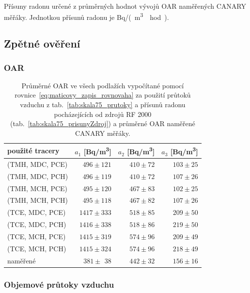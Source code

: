 \begin{table}[H]
    \centering
    \caption{Přísuny radonu určené z průměrných hodnot vývojů OAR naměřených CANARY měřáky. Jednotkou přísunů radonu je \si{Bq/(m^3\cdot hod)}.}
    \label{tab:skala75_prisunyRovnovazneCANARY}
   
\end{table}

\subsection{Zpětné ověření}

\subsubsection{OAR}
\begin{table}[H]
    \centering
    \caption{Průměrné OAR ve všech podlažích vypočítané pomocí rovnice~\eqref{eq:maticovy_zapis_rovnovaha} za použití průtoků vzduchu z tab.~\ref{tab:skala75_prutoky} a přísunů radonu pocházejících od zdrojů RF 2000 (tab.~\ref{tab:skala75_prisunyZdroj}) a průměrné OAR naměřené CANARY měřáky.}
    \label{tab:skala75_OAR_zpetne}
    \begin{tabular}{lrrr}
        \toprule
  použité tracery  & $a_1$ [\si{Bq/m^3}] &  $a_2$ [\si{Bq/m^3}]& $a_3$ [\si{Bq/m^3}] \\
        \midrule
(TMH, MDC, PCE) & $ 496\pm121$ & $410\pm72$ & $103\pm25$ \\
(TMH, MDC, PCH) & $ 496\pm119$ & $410\pm72$ & $107\pm26$ \\
(TMH, MCH, PCE) & $ 495\pm120$ & $467\pm83$ & $102\pm25$ \\
(TMH, MCH, PCH) & $ 495\pm118$ & $467\pm82$ & $107\pm26$ \\
(TCE, MDC, PCE) & $1417\pm333$ & $518\pm85$ & $209\pm50$ \\
(TCE, MDC, PCH) & $1416\pm338$ & $518\pm86$ & $219\pm50$ \\
(TCE, MCH, PCE) & $1415\pm319$ & $574\pm96$ & $209\pm49$ \\
(TCE, MCH, PCH) & $1415\pm324$ & $574\pm96$ & $218\pm49$ \\
\midrule
       naměřené & $381\pm\ \,38$ & $442\pm32$ & $156\pm16$ \\
        \bottomrule
    \end{tabular}
\end{table}

\subsubsection{Objemové průtoky vzduchu}

